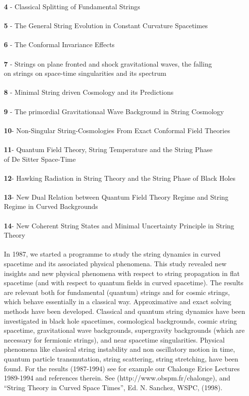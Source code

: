 \documentclass[12pt,a4paper]{article}
\begin{document}
{\bf 4} - Classical Splitting of Fundamental Strings\\ \\
{\bf 5} - The General String Evolution in Constant Curvature Spacetimes\\ \\
{\bf 6} - The Conformal Invariance Effects \\ \\
{\bf 7} - Strings on plane fronted and shock gravitational waves, the falling
\\
    on strings on space-time singularities and its spectrum\\ \\
{\bf 8} - Minimal String driven Cosmology and its Predictions\\ \\
{\bf 9} - The primordial Gravitationaal Wave Background in String Cosmology\\ \\
{\bf 10}- Non-Singular String-Cosmologies From Exact Conformal Field Theories\\ \\
{\bf 11}- Quantum Field Theory, String Temperature and the String Phase \\
    of De Sitter Space-Time\\ \\
{\bf 12}- Hawking Radiation in String Theory and the String Phase of Black 
Holes\\ \\
{\bf 13}- New Dual Relation between Quantum Field Theory Regime and String 
    Regime in Curved Backgrounds\\ \\
{\bf 14}- New Coherent String States and Minimal Uncertainty Principle in 
    String Theory\\ \\
In 1987, we started a programme \cite{vs1} to study the string dynamics in 
curved
spacetime and its associated physical phenomena. This study revealed new
insights and new physical phenomena with respect to string propagation in 
flat spacetime (and with respect to quantum fields in curved spacetime). 
The results are relevant both for fundamental (quantum) 
strings and for cosmic strings, which behave essentially in a classical way. 
Approximative and exact solving methods have been developed. Classical and 
quantum string dynamics have been investigated in black hole spacetimes,
cosmological backgrounds, cosmic string spacetime, gravitational wave 
backgrounds, supergravity backgrounds (which are necessary for fermionic
strings), and near spacetime singularities. Physical phenomena like 
classical string instability and non oscillatory motion in time, quantum 
particle transmutation, string scattering, string stretching, have been 
found. For the results (1987-1994) see for example our Chalonge Erice Lectures 1989-1994 and references therein. See (http://www.obspm.fr/chalonge), 
and ``String Theory in Curved Space Times'', Ed. N. Sanchez, WSPC, (1998). \\
\end{document}

